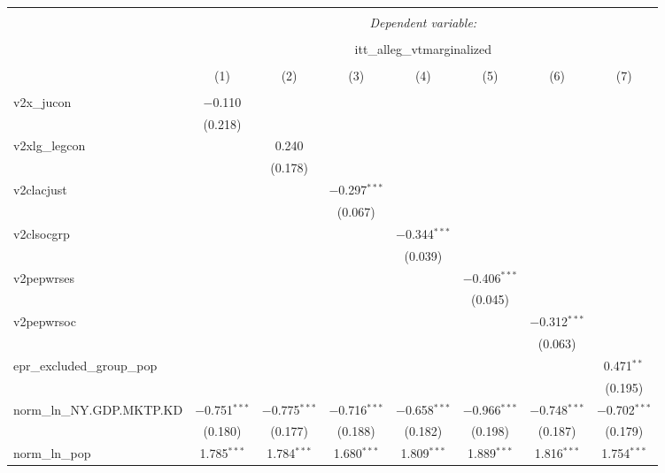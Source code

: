 
\begin{sidewaystable}[!htbp] \centering 
  \caption{} 
  \label{} 
\tiny 
\begin{tabular}{@{\extracolsep{5pt}}lccccccc} 
\\[-1.8ex]\hline 
\hline \\[-1.8ex] 
 & \multicolumn{7}{c}{\textit{Dependent variable:}} \\ 
\cline{2-8} 
\\[-1.8ex] & \multicolumn{7}{c}{itt\_alleg\_vtmarginalized} \\ 
\\[-1.8ex] & (1) & (2) & (3) & (4) & (5) & (6) & (7)\\ 
\hline \\[-1.8ex] 
 v2x\_jucon & $-$0.110 &  &  &  &  &  &  \\ 
  & (0.218) &  &  &  &  &  &  \\ 
  v2xlg\_legcon &  & 0.240 &  &  &  &  &  \\ 
  &  & (0.178) &  &  &  &  &  \\ 
  v2clacjust &  &  & $-$0.297$^{***}$ &  &  &  &  \\ 
  &  &  & (0.067) &  &  &  &  \\ 
  v2clsocgrp &  &  &  & $-$0.344$^{***}$ &  &  &  \\ 
  &  &  &  & (0.039) &  &  &  \\ 
  v2pepwrses &  &  &  &  & $-$0.406$^{***}$ &  &  \\ 
  &  &  &  &  & (0.045) &  &  \\ 
  v2pepwrsoc &  &  &  &  &  & $-$0.312$^{***}$ &  \\ 
  &  &  &  &  &  & (0.063) &  \\ 
  epr\_excluded\_group\_pop &  &  &  &  &  &  & 0.471$^{**}$ \\ 
  &  &  &  &  &  &  & (0.195) \\ 
  norm\_ln\_NY.GDP.MKTP.KD & $-$0.751$^{***}$ & $-$0.775$^{***}$ & $-$0.716$^{***}$ & $-$0.658$^{***}$ & $-$0.966$^{***}$ & $-$0.748$^{***}$ & $-$0.702$^{***}$ \\ 
  & (0.180) & (0.177) & (0.188) & (0.182) & (0.198) & (0.187) & (0.179) \\ 
  norm\_ln\_pop & 1.785$^{***}$ & 1.784$^{***}$ & 1.680$^{***}$ & 1.809$^{***}$ & 1.889$^{***}$ & 1.816$^{***}$ & 1.754$^{***}$ \\ 

\end{tabular}
\end{sidewaystable}

